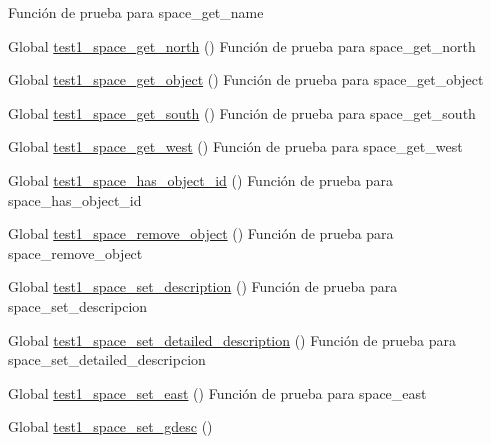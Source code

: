 \begin{DoxyRefList}
%
Función de prueba para space\+\_\+get\+\_\+name  
\item[Global \mbox{\hyperlink{space__test_8c_a3a87f1e1e173d622bfbd3bcd14e060ca}{test1\+\_\+space\+\_\+get\+\_\+north}} ()]\label{test__test000263}%
%
Función de prueba para space\+\_\+get\+\_\+north  
\item[Global \mbox{\hyperlink{space__test_8c_a4a1ca89fa511c04bb07c14edb19c17ba}{test1\+\_\+space\+\_\+get\+\_\+object}} ()]\label{test__test000271}%
%
Función de prueba para space\+\_\+get\+\_\+object  
\item[Global \mbox{\hyperlink{space__test_8c_a8e345065f58565e131bdb3a9d0096ed5}{test1\+\_\+space\+\_\+get\+\_\+south}} ()]\label{test__test000265}%
%
Función de prueba para space\+\_\+get\+\_\+south  
\item[Global \mbox{\hyperlink{space__test_8c_a1f08c6866885bfc093717f57b1b86539}{test1\+\_\+space\+\_\+get\+\_\+west}} ()]\label{test__test000269}%
%
Función de prueba para space\+\_\+get\+\_\+west  
\item[Global \mbox{\hyperlink{space__test_8c_a4b892f7edf25e12eb9667ab34c325bf5}{test1\+\_\+space\+\_\+has\+\_\+object\+\_\+id}} ()]\label{test__test000275}%
%
Función de prueba para space\+\_\+has\+\_\+object\+\_\+id  
\item[Global \mbox{\hyperlink{space__test_8c_a8edeba07aa351da3c1b4bdf4a18c2f7b}{test1\+\_\+space\+\_\+remove\+\_\+object}} ()]\label{test__test000273}%
%
Función de prueba para space\+\_\+remove\+\_\+object  
\item[Global \mbox{\hyperlink{space__test_8c_a19a1bac3ab9cc6f5bf7ea8c4a72392c4}{test1\+\_\+space\+\_\+set\+\_\+description}} ()]\label{test__test000282}%
%
Función de prueba para space\+\_\+set\+\_\+descripcion  
\item[Global \mbox{\hyperlink{space__test_8c_a0a3024e47d0354245b76a9728730a998}{test1\+\_\+space\+\_\+set\+\_\+detailed\+\_\+description}} ()]\label{test__test000292}%
%
Función de prueba para space\+\_\+set\+\_\+detailed\+\_\+descripcion  
\item[Global \mbox{\hyperlink{space__test_8c_ab1f093af4be3ca8e525d0517cc846f47}{test1\+\_\+space\+\_\+set\+\_\+east}} ()]\label{test__test000253}%
%
Función de prueba para space\+\_\+east  
\item[Global \mbox{\hyperlink{space__test_8c_a068c22b91236896ae1b077a8f7059458}{test1\+\_\+space\+\_\+set\+\_\+gdesc}} ()]\label{test__test000278}%

\end{DoxyRefList}
